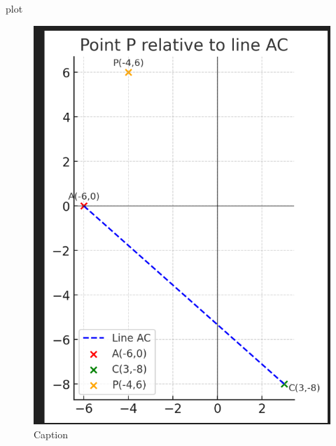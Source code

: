 \documentclass{beamer}
\begin{document}
\begin{frame}{plot}
\begin{figure}[H!]
    \centering
    \includegraphics[width=0.5\linewidth]{Fig1.png}
    \caption{Caption}
    \label{fig:placeholder}
\end{figure}

\end{frame}
    
\end{document}
